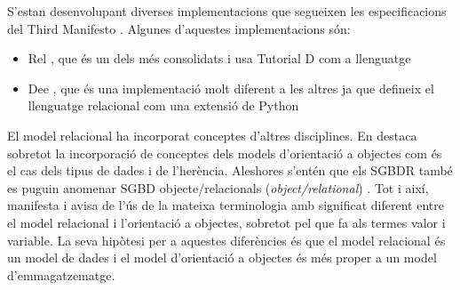 S'estan desenvolupant diverses implementacions que segueixen les
especificacions del Third
Manifesto \parencite[Projects]{date:thethirdmanifesto.com}.  Algunes
d'aquestes implementacions són:
\begin{itemize}
\item Rel \parencite{rel}, que és un dels més consolidats i usa
  Tutorial D com a llenguatge
\item Dee \parencite{dee}, que és una implementació molt diferent a
  les altres ja que defineix el llenguatge relacional com una extensió
  de Python
\end{itemize}



\todo{}

El model relacional ha incorporat conceptes d'altres disciplines. En
destaca sobretot la incorporació de conceptes dels models d'orientació
a objectes com és el cas dels tipus de dades i de l'herència.
Aleshores s'entén que els SGBDR també es puguin anomenar SGBD
objecte/relacionals (\emph{object/relational})
\parencite{date02:foundation}.  Tot i així, \textcite[cap.~6]{date06}
manifesta i avisa de l'ús de la mateixa terminologia amb significat
diferent entre el model relacional i l'orientació a objectes, sobretot
pel que fa als termes valor i variable. %
La seva hipòtesi per a aquestes diferències és que el model relacional
és un model de dades i el model d'orientació a objectes és més proper
a un model
d'emmagatzematge. %



